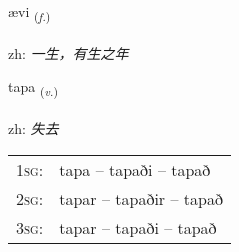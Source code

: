 \documentclass[frontgrid, backgrid]{flacards}\usepackage[]{graphicx}\usepackage[]{color}
\begin{document}
\renewcommand{\flhead}{\vskip5pt \fboxsep=0pt {\small\bfseries\footnotesize Nafnorð | 名词}}
\renewcommand{\fcfoot}{\vskip5pt \fboxsep=0pt \hspace{2pt}{\small\bfseries\footnotesize 2K}}

\renewcommand{\blhead}{\vskip5pt {\small\bfseries\footnotesize Nafnorð | 名词 }}
\renewcommand{\bcfoot}{\vskip5pt \hspace{2pt}{\small\bfseries\footnotesize 2K}}


{ævi \small{\textsubscript{(\textit{f.})}} \\[1ex] %
\textphonetic{[aiːvɪ]} \\
zh: \emph{一生，有生之年} \\  [2ex]
\renewcommand*{\arraystretch}{0.8}
}

\renewcommand{\flhead}{\vskip5pt \fboxsep=0pt {\small\bfseries\footnotesize Sagnorð | 动词}}
\renewcommand{\fcfoot}{\vskip5pt \fboxsep=0pt \hspace{2pt}{\small\bfseries\footnotesize 2K}}

\renewcommand{\blhead}{\vskip5pt {\small\bfseries\footnotesize Sagnorð | 动词 }}
\renewcommand{\bcfoot}{\vskip5pt \hspace{2pt}{\small\bfseries\footnotesize 2K}}


{tapa \small{\textsubscript{(\textit{v.})}} \\[1ex] %
\textphonetic{[tʰaːpa]} \\
zh: \emph{失去} \\  [2ex]
\renewcommand*{\arraystretch}{0.8}
\begin{tabular}{p{1cm}l}
\textsc{1sg}: & tapa -- tapaði -- tapað \\ 
\textsc{2sg}: & tapar -- tapaðir -- tapað \\ 
\textsc{3sg}: & tapar -- tapaði -- tapað \\ 
\end{tabular}
}
\end{document}
